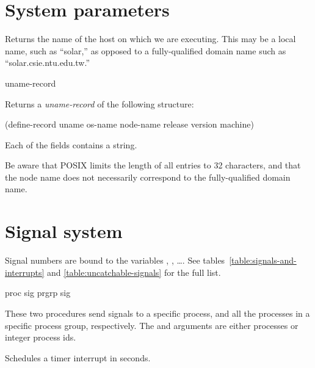 \section{System parameters}

{} \str
\begin{desc}
Returns the name of the host on which we are executing.
This may be a local name, such as ``solar,'' as opposed to a
fully-qualified domain name such as ``solar.csie.ntu.edu.tw.''
\end{desc}

 {uname-record}
\begin{desc}
  Returns a \emph{uname-record} of the following structure:
\begin{code}
(define-record uname
   os-name
   node-name
   release
   version
   machine)\end{code}%

Each of the fields contains a string.

Be aware that POSIX limits the length of all entries to 32 characters,
and that the node name does not necessarily correspond to the
fully-qualified domain name.
\end{desc}

\section{Signal system}

Signal numbers are bound to the variables , ,
\ldots. See tables~\ref{table:signals-and-interrupts} and 
\ref{table:uncatchable-signals} for the full list.

   {proc sig}   \undefined
{} {prgrp sig} \undefined
\begin{desc}
These two procedures send signals to a specific process, and all the processes
in a specific process group, respectively.
The  and  arguments are either processes 
or integer process ids.
\end{desc}

 \undefined
\begin{desc}
  Schedules a timer interrupt in  seconds.
\end{desc}

